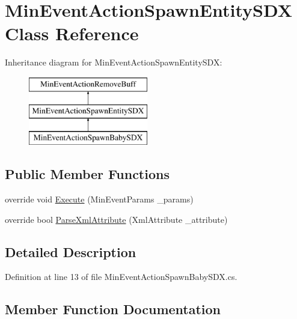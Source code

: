 \hypertarget{class_min_event_action_spawn_entity_s_d_x}{}\section{Min\+Event\+Action\+Spawn\+Entity\+S\+DX Class Reference}
\label{class_min_event_action_spawn_entity_s_d_x}
Inheritance diagram for Min\+Event\+Action\+Spawn\+Entity\+S\+DX\+:\begin{figure}[H]
\begin{center}
\leavevmode
\includegraphics[height=3.000000cm]{class_min_event_action_spawn_entity_s_d_x}
\end{center}
\end{figure}
\subsection*{Public Member Functions}
\begin{DoxyCompactItemize}
\item 
override void \mbox{\hyperlink{class_min_event_action_spawn_entity_s_d_x_ab1fd41d8728344b825783fc8470e439d}{Execute}} (Min\+Event\+Params \+\_\+params)
\item 
override bool \mbox{\hyperlink{class_min_event_action_spawn_entity_s_d_x_a389a7121b78b6fa55999a29d77b7886e}{Parse\+Xml\+Attribute}} (Xml\+Attribute \+\_\+attribute)
\end{DoxyCompactItemize}


\subsection{Detailed Description}


Definition at line 13 of file Min\+Event\+Action\+Spawn\+Baby\+S\+D\+X.\+cs.



\subsection{Member Function Documentation}
\mbox{\label{class_min_event_action_spawn_entity_s_d_x_ab1fd41d8728344b825783fc8470e439d}} 
